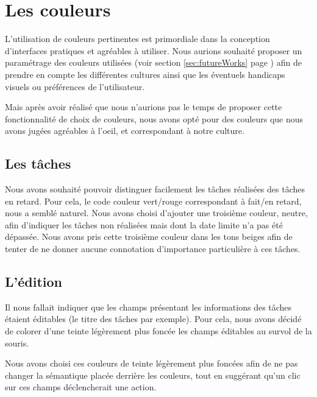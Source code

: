 \documentclass[11pt]{article}
\begin{document}
\section{Les couleurs}

L'utilisation de couleurs pertinentes est primordiale dans la
conception d'interfaces pratiques et agréables à utiliser. Nous
aurions souhaité proposer un paramétrage des couleurs utilisées (voir
section \ref{sec:futureWorks} page \pageref{sec:futureWorks}) afin de
prendre en compte les différentes cultures ainsi que les éventuels
handicaps visuels ou préférences de l'utilisateur.

Mais après avoir réalisé que nous n'aurions pas le temps de proposer
cette fonctionnalité de choix de couleurs, nous avons opté pour des
couleurs que nous avons jugées agréables à l'oeil, et correspondant à
notre culture.


\subsection{Les tâches}

Nous avons souhaité pouvoir distinguer facilement les tâches réalisées
des tâches en retard. Pour cela, le code couleur vert/rouge
correspondant à fait/en retard, nous a semblé naturel. Nous avons
choisi d'ajouter une troisième couleur, neutre, afin d'indiquer les
tâches non réalisées mais dont la date limite n'a pas été dépassée.
Nous avons pris cette troisième couleur dans les tons beiges afin de
tenter de ne donner aucune connotation d'importance particulière à ces
tâches.



\subsection{L'édition}

Il nous fallait indiquer que les champs présentant les informations
des tâches étaient éditables (le titre des tâches par exemple). Pour
cela, nous avons décidé de colorer d'une teinte légèrement plus foncée
les champs éditables au survol de la souris.

Nous avons choisi ces couleurs de teinte légèrement plus foncées afin
de ne pas changer la sémantique placée derrière les couleurs, tout en
suggérant qu'un clic sur ces champs déclencherait une action.
\end{document}
